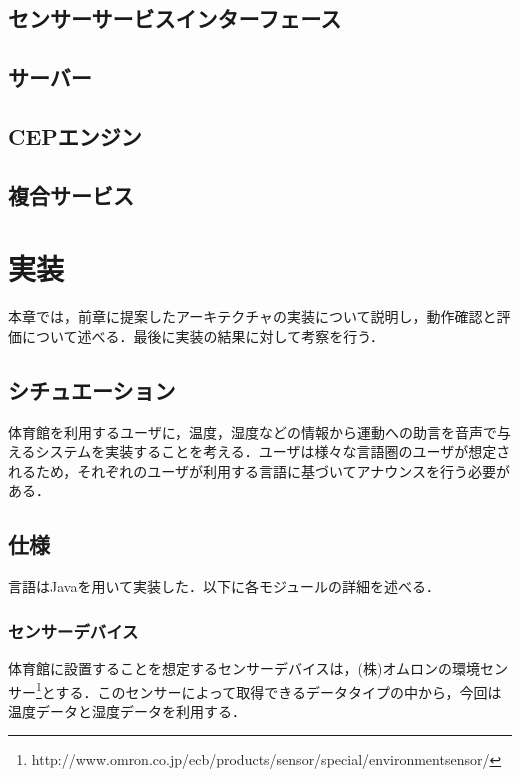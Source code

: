 \documentclass{kuisthesis}			%
\begin{document}
\subsection{センサーサービスインターフェース}

\subsection{サーバー}

\subsection{CEPエンジン}

\subsection{複合サービス}

\section{実装}
本章では，前章に提案したアーキテクチャの実装について説明し，動作確認と評価について述べる．最後に実装の結果に対して考察を行う．
\subsection{シチュエーション}
体育館を利用するユーザに，温度，湿度などの情報から運動への助言を音声で与えるシステムを実装することを考える．ユーザは様々な言語圏のユーザが想定されるため，それぞれのユーザが利用する言語に基づいてアナウンスを行う必要がある．

\subsection{仕様}
言語はJavaを用いて実装した．以下に各モジュールの詳細を述べる．
\subsubsection{センサーデバイス}
体育館に設置することを想定するセンサーデバイスは，(株)オムロンの環境センサー\footnote{http://www.omron.co.jp/ecb/products/sensor/special/environmentsensor/}とする．このセンサーによって取得できるデータタイプの中から，今回は温度データと湿度データを利用する．
\end{document}
